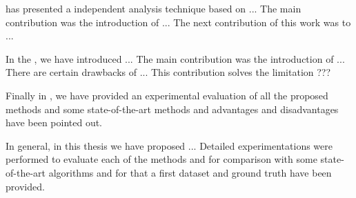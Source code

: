  has presented a independent analysis technique based on ...
The main contribution was the introduction of ...
The next contribution of this work was to ...

In the , we have introduced ...%
The main contribution was the introduction of ...
There are certain drawbacks of ...
This contribution solves the limitation ???


Finally in , we have provided an experimental evaluation of all the proposed methods and some state-of-the-art methods and advantages and disadvantages have been pointed out.

In general, in this thesis we have proposed ...
Detailed experimentations were performed to evaluate each of the methods and for comparison with some state-of-the-art algorithms and for that a first dataset and ground truth have been provided.

